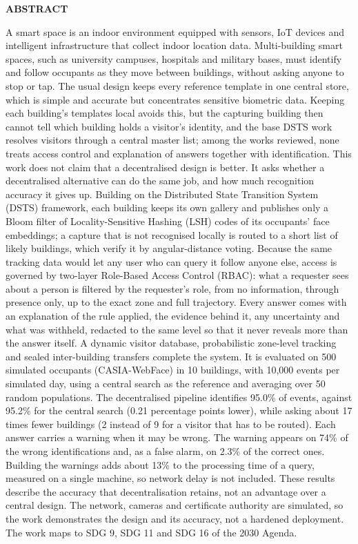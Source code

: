 \documentclass[12pt,a4paper,oneside]{report}
\begin{document}
\clearpage
{}
{}
{\centering \Large\bfseries ABSTRACT\par}
A smart space is an indoor environment equipped with sensors, IoT devices and intelligent infrastructure that collect indoor location data. Multi-building smart spaces, such as university campuses, hospitals and military bases, must identify and follow occupants as they move between buildings, without asking anyone to stop or tap. The usual design keeps every reference template in one central store, which is simple and accurate but concentrates sensitive biometric data. Keeping each building's templates local avoids this, but the capturing building then cannot tell which building holds a visitor's identity, and the base DSTS work resolves visitors through a central master list; among the works reviewed, none treats access control and explanation of answers together with identification. This work does not claim that a decentralised design is better. It asks whether a decentralised alternative can do the same job, and how much recognition accuracy it gives up. Building on the Distributed State Transition System (DSTS) framework, each building keeps its own gallery and publishes only a Bloom filter of Locality-Sensitive Hashing (LSH) codes of its occupants' face embeddings; a capture that is not recognised locally is routed to a short list of likely buildings, which verify it by angular-distance voting. Because the same tracking data would let any user who can query it follow anyone else, access is governed by two-layer Role-Based Access Control (RBAC): what a requester sees about a person is filtered by the requester's role, from no information, through presence only, up to the exact zone and full trajectory. Every answer comes with an explanation of the rule applied, the evidence behind it, any uncertainty and what was withheld, redacted to the same level so that it never reveals more than the answer itself. A dynamic visitor database, probabilistic zone-level tracking and sealed inter-building transfers complete the system. It is evaluated on 500 simulated occupants (CASIA-WebFace) in 10 buildings, with 10,000 events per simulated day, using a central search as the reference and averaging over 50 random populations. The decentralised pipeline identifies 95.0\% of events, against 95.2\% for the central search (0.21 percentage points lower), while asking about 17 times fewer buildings (2 instead of 9 for a visitor that has to be routed). Each answer carries a warning when it may be wrong. The warning appears on 74\% of the wrong identifications and, as a false alarm, on 2.3\% of the correct ones. Building the warnings adds about 13\% to the processing time of a query, measured on a single machine, so network delay is not included. These results describe the accuracy that decentralisation retains, not an advantage over a central design. The network, cameras and certificate authority are simulated, so the work demonstrates the design and its accuracy, not a hardened deployment. The work maps to SDG 9, SDG 11 and SDG 16 of the 2030 Agenda.
\end{document}
